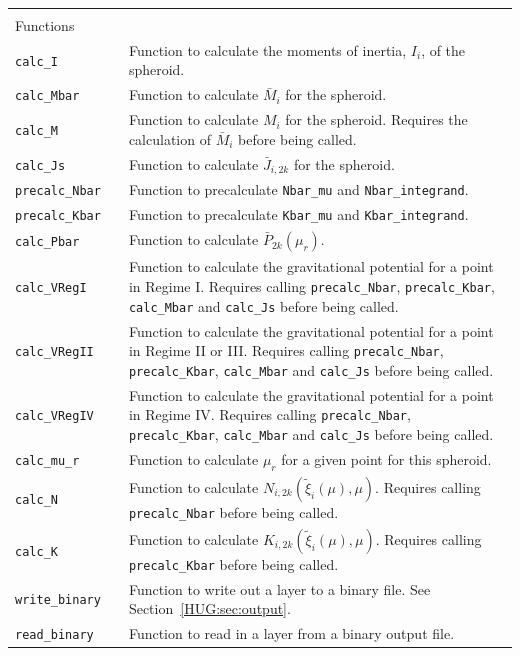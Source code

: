 \documentclass[11pt, oneside]{article}   	%
\begin{document}
\begin{longtable}{l l p{10cm}}
\multicolumn{3}{l}{} \\
\multicolumn{3}{l}{Functions} \\
\hline
\texttt{calc\_I} & & Function to calculate the moments of inertia, $I_i$, of the spheroid. \\
\texttt{calc\_Mbar} & & Function to calculate $\bar{M}_i$ for the spheroid. \\
\texttt{calc\_M} & & Function to calculate $M_i$ for the spheroid. Requires the calculation of $\bar{M}_i$ before being called. \\
\texttt{calc\_Js} & & Function to calculate $\bar{J}_{i,2k}$ for the spheroid. \\
\texttt{precalc\_Nbar} & & Function to precalculate \texttt{Nbar\_mu}  and \texttt{Nbar\_integrand}. \\
\texttt{precalc\_Kbar} & & Function to precalculate \texttt{Kbar\_mu}  and \texttt{Kbar\_integrand}. \\
\texttt{calc\_Pbar} & & Function to calculate $\bar{P}_{2k}(\mu_r)$. \\
\texttt{calc\_VRegI} & & Function to calculate the gravitational potential for a point in Regime I. Requires calling \texttt{precalc\_Nbar}, \texttt{precalc\_Kbar}, \texttt{calc\_Mbar} and \texttt{calc\_Js} before being called.  \\
\texttt{calc\_VRegII} & & Function to calculate the gravitational potential for a point in Regime II or III. Requires calling \texttt{precalc\_Nbar}, \texttt{precalc\_Kbar}, \texttt{calc\_Mbar} and \texttt{calc\_Js} before being called.   \\
\texttt{calc\_VRegIV} & & Function to calculate the gravitational potential for a point in Regime IV. Requires calling \texttt{precalc\_Nbar}, \texttt{precalc\_Kbar}, \texttt{calc\_Mbar} and \texttt{calc\_Js} before being called. \\
\texttt{calc\_mu\_r} & & Function to calculate $\mu_r$ for a given point for this spheroid. \\
\texttt{calc\_N} & & Function to calculate $N_{i,2k} (\tilde{\xi}_i (\mu), \mu)$. Requires calling \texttt{precalc\_Nbar} before being called. \\
\texttt{calc\_K} & & Function to calculate $K_{i,2k} (\tilde{\xi}_i (\mu), \mu)$. Requires calling \texttt{precalc\_Kbar} before being called. \\
\texttt{write\_binary} & & Function to write out a layer to a binary file. See Section~\ref{HUG:sec:output}. \\
\texttt{read\_binary} & & Function to read in a layer from a binary output file. \\

\end{longtable}
\vspace{0.5 cm}
\end{document}
